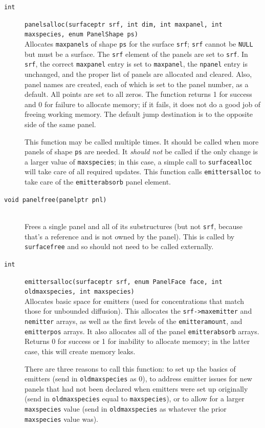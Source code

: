 \documentclass {scrbook}
\newcommand {\ttt} {\texttt}
\begin{document}
\begin{description}
\item[\ttt{int}]
\ttt{panelsalloc(surfaceptr srf, int dim, int maxpanel, int maxspecies, enum PanelShape ps)}
\hfill \\
Allocates \ttt{maxpanels} of shape \ttt{ps} for the surface \ttt{srf}; \ttt{srf} cannot be \ttt{NULL} but must be a surface. The \ttt{srf} element of the panels are set to \ttt{srf}. In \ttt{srf}, the correct \ttt{maxpanel} entry is set to \ttt{maxpanel}, the \ttt{npanel} entry is unchanged, and the proper list of panels are allocated and cleared. Also, panel names are created, each of which is set to the panel number, as a default. All points are set to all zeros. The function returns 1 for success and 0 for failure to allocate memory; if it fails, it does not do a good job of freeing working memory. The default jump destination is to the opposite side of the same panel.

This function may be called multiple times. It should be called when more panels of shape \ttt{ps} are needed. It \emph{should not} be called if the only change is a larger value of \ttt{maxspecies}; in this case, a simple call to \ttt{surfacealloc} will take care of all required updates. This function calls \ttt{emittersalloc} to take care of the \ttt{emitterabsorb} panel element.

\item[\ttt{void panelfree(panelptr pnl)}]
\hfill \\
Frees a single panel and all of its substructures (but not \ttt{srf}, because that's a reference and is not owned by the panel). This is called by \ttt{surfacefree} and so should not need to be called externally.

\item[\ttt{int}]
\ttt{emittersalloc(surfaceptr srf, enum PanelFace face, int oldmaxspecies, int maxspecies)}
\hfill \\
Allocates basic space for emitters (used for concentrations that match those for unbounded diffusion). This allocates the \ttt{srf->maxemitter} and \ttt{nemitter} arrays, as well as the first levels of the \ttt{emitteramount}, and \ttt{emitterpos} arrays. It also allocates all of the panel \ttt{emitterabsorb} arrays. Returns 0 for success or 1 for inability to allocate memory; in the latter case, this will create memory leaks.

There are three reasons to call this function: to set up the basics of emitters (send in \ttt{oldmaxspecies} as 0), to address emitter issues for new panels that had not been declared when emitters were set up originally (send in \ttt{oldmaxspecies} equal to \ttt{maxspecies}), or to allow for a larger \ttt{maxspecies} value (send in \ttt{oldmaxspecies} as whatever the prior \ttt{maxspecies} value was).


\end{description}
\end{document}

